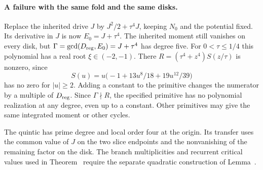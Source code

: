 \paragraph{A failure with the same fold and the same disks.}
Replace the inherited drive $J$ by $J^2/2+\tau^4J$, keeping $N_0$ and the potential fixed. Its derivative in $J$ is now $E_0=J+\tau^4$. The inherited moment still vanishes on every disk, but $\Gamma=\gcd(D_{\rm reg},E_0)=J+\tau^4$ has degree five. For $0<\tau\le1/4$ this polynomial has a real root $\xi\in(-2,-1)$. There $R=(\tau^4+z^4)S(z/\tau)$ is nonzero, since
\[
 S(u)=u\bigl(-1+13u^8/18+19u^{12}/39\bigr)
\]
has no zero for $|u|\ge2$. Adding a constant to the primitive changes the numerator by a multiple of $D_{\rm reg}$. Since $\Gamma\nmid R$, the specified primitive has no polynomial realization at any degree, even up to a constant. Other primitives may give the same integrated moment or other cycles.

The quintic has prime degree and local order four at the origin. Its transfer uses the common value of $J$ on the two slice endpoints and the nonvanishing of the remaining factor on the disk. The branch multiplicities and recurrent critical values used in Theorem~ require the separate quadratic construction of Lemma~.
